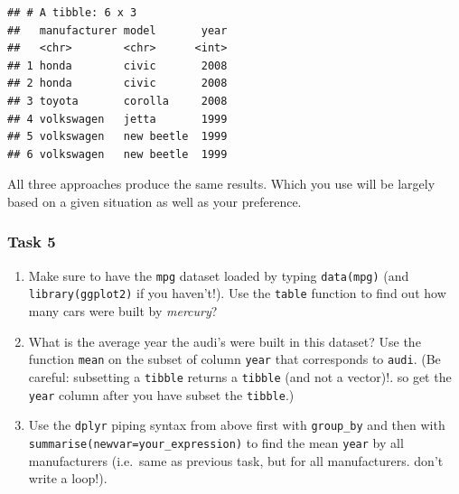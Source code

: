 \documentclass[]{book}
\newenvironment{Shaded}{\begin{snugshade}}{\end{snugshade}}
\newcommand{\KeywordTok}[1]{\textcolor[rgb]{0.13,0.29,0.53}{\textbf{#1}}}
\newcommand{\DecValTok}[1]{\textcolor[rgb]{0.00,0.00,0.81}{#1}}
\newcommand{\StringTok}[1]{\textcolor[rgb]{0.31,0.60,0.02}{#1}}
\newcommand{\OperatorTok}[1]{\textcolor[rgb]{0.81,0.36,0.00}{\textbf{#1}}}
\newcommand{\NormalTok}[1]{#1}
\providecommand{\tightlist}{%
  \setlength{\itemsep}{0pt}\setlength{\parskip}{0pt}}
\theoremstyle{definition}
\theoremstyle{definition}
\theoremstyle{definition}
\theoremstyle{remark}
\begin{document}
\begin{Shaded}
\end{Shaded}

\begin{verbatim}
## # A tibble: 6 x 3
##   manufacturer model       year
##   <chr>        <chr>      <int>
## 1 honda        civic       2008
## 2 honda        civic       2008
## 3 toyota       corolla     2008
## 4 volkswagen   jetta       1999
## 5 volkswagen   new beetle  1999
## 6 volkswagen   new beetle  1999
\end{verbatim}

All three approaches produce the same results. Which you use will be
largely based on a given situation as well as your preference.

\subsubsection{Task 5}\label{task-5}

\begin{enumerate}
\def\labelenumi{\arabic{enumi}.}
\tightlist
\item
  Make sure to have the \texttt{mpg} dataset loaded by typing
  \texttt{data(mpg)} (and \texttt{library(ggplot2)} if you haven't!).
  Use the \texttt{table} function to find out how many cars were built
  by \emph{mercury}?
\item
  What is the average year the audi's were built in this dataset? Use
  the function \texttt{mean} on the subset of column \texttt{year} that
  corresponds to \texttt{audi}. (Be careful: subsetting a
  \texttt{tibble} returns a \texttt{tibble} (and not a vector)!. so get
  the \texttt{year} column after you have subset the \texttt{tibble}.)
\item
  Use the \texttt{dplyr} piping syntax from above first with
  \texttt{group\_by} and then with
  \texttt{summarise(newvar=your\_expression)} to find the mean
  \texttt{year} by all manufacturers (i.e.~same as previous task, but
  for all manufacturers. don't write a loop!).
\end{enumerate}
\end{document}
